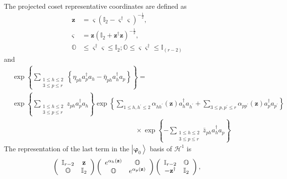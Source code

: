 \documentclass[aps,preprint]{revtex4}%
\begin{document}
The projected coset representative coordinates are defined as
\begin{align}
\mathbf{z}  &  =\mathbf{\varsigma}\left(  \mathbb{I}_{2}-\mathbf{\varsigma
}^{\dagger}\mathbf{\varsigma}\right)  ^{-\frac{1}{2}},\nonumber\\
\mathbf{\varsigma}  &  =\mathbf{z}\left(  \mathbb{I}_{2}+\mathbf{z}^{\dagger
}\mathbf{z}\right)  ^{-\frac{1}{2}},\nonumber\\
\mathbb{O}  &  \leq\mathbf{\varsigma}^{\dagger}\mathbf{\varsigma}%
\leq\mathbb{I}_{2};\mathbb{O}\leq\mathbf{\varsigma\mathbf{\varsigma}^{\dagger
}}\leq\mathbb{I}_{\left(  r-2\right)  }%
\end{align}
and%
\begin{align}
&  \exp\left\{  \sum\limits_{\substack{1\leq h\leq2\\3\leq p\leq r}}\left\{
\eta_{ph}a_{p}^{\dagger}a_{h}-\bar{\eta}_{ph}a_{h}^{\dagger}a_{p}\right\}
\right\}  =\nonumber\\
&  \exp\left\{  \sum\limits_{\substack{1\leq h\leq2\\3\leq p\leq r}%
}z_{ph}a_{p}^{\dagger}a_{h}\right\}  \exp\left\{  \sum\limits_{1\leq
h,h^{\prime}\leq2}\alpha_{hh^{\prime}}\left(  \mathbf{z}\right)
a_{h}^{\dagger}a_{h^{\prime}}+\sum\limits_{3\leq p,p^{\prime}\leq r}%
\alpha_{pp^{\prime}}\left(  \mathbf{z}\right)  a_{p}^{\dagger}a_{p^{\prime}%
}\right\} \nonumber\\
&  \qquad\qquad\qquad\qquad\qquad\qquad\qquad\qquad\qquad\times\exp\left\{
-\sum\limits_{\substack{1\leq h\leq2\\3\leq p\leq r}}\bar{z}_{ph}%
a_{h}^{\dagger}a_{p}\right\}
\end{align}
The representation of the last term in the $\left\vert \mathbf{\varphi}%
_{0}\right\rangle $ basis of $\mathcal{H}^{1}$ is
\begin{equation}
\left(
\begin{array}
[c]{cc}%
\mathbb{I}_{r-2} & \mathbf{z}\\
\mathbb{O} & \mathbb{I}_{2}%
\end{array}
\right)  \left(
\begin{array}
[c]{cc}%
e^{\mathbf{\alpha}_{h}\left(  \mathbf{z}\right)  } & \mathbb{O}\\
\mathbb{O} & e^{\mathbf{\alpha}_{p}\left(  \mathbf{z}\right)  }%
\end{array}
\right)  \left(
\begin{array}
[c]{cc}%
\mathbb{I}_{r-2} & \mathbb{O}\\
-\mathbf{z}^{\dagger} & \mathbb{I}_{2}%
\end{array}
\right)  ,
\end{equation}
\end{document}
